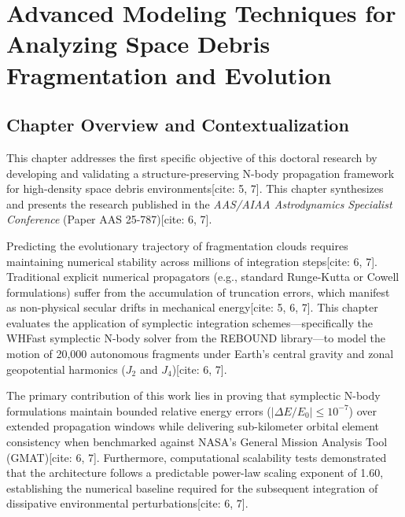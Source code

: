\documentclass[12pt,letterpaper,twoside]{book}
\begin{document}
\cleardoublepage

\chapter{Advanced Modeling Techniques for Analyzing Space Debris Fragmentation and Evolution}
\label{ch:paper1}

\section*{Chapter Overview and Contextualization}
This chapter addresses the first specific objective of this doctoral research by developing and validating a structure-preserving N-body propagation framework for high-density space debris environments[cite: 5, 7]. This chapter synthesizes and presents the research published in the \textit{AAS/AIAA Astrodynamics Specialist Conference} (Paper AAS 25-787)[cite: 6, 7].

Predicting the evolutionary trajectory of fragmentation clouds requires maintaining numerical stability across millions of integration steps[cite: 6, 7]. Traditional explicit numerical propagators (e.g., standard Runge-Kutta or Cowell formulations) suffer from the accumulation of truncation errors, which manifest as non-physical secular drifts in mechanical energy[cite: 5, 6, 7]. This chapter evaluates the application of symplectic integration schemes—specifically the WHFast symplectic N-body solver from the REBOUND library—to model the motion of 20,000 autonomous fragments under Earth's central gravity and zonal geopotential harmonics ($J_2$ and $J_4$)[cite: 6, 7].

The primary contribution of this work lies in proving that symplectic N-body formulations maintain bounded relative energy errors ($|\Delta E/E_0| \le 10^{-7}$) over extended propagation windows while delivering sub-kilometer orbital element consistency when benchmarked against NASA's General Mission Analysis Tool (GMAT)[cite: 6, 7]. Furthermore, computational scalability tests demonstrated that the architecture follows a predictable power-law scaling exponent of 1.60, establishing the numerical baseline required for the subsequent integration of dissipative environmental perturbations[cite: 6, 7].

\newpage

\end{document}
